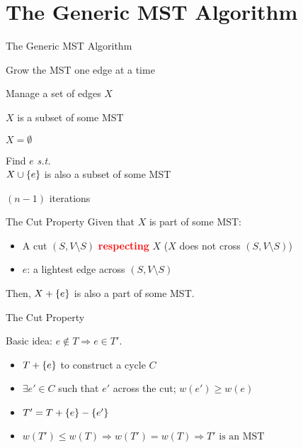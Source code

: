 \section{The Generic MST Algorithm}	\label{section:mst-generic-alg}

\begin{frame}{The Generic MST Algorithm}
  \begin{description}
	\setlength{\itemsep}{5pt}
	\item<1->[Overview:] Grow the MST one edge at a time
	\item<2->[State:] Manage a set of edges $X$
	\item<3->[\textcolor{red}{\bf Invariant:}] $X$ is a subset of some MST
	\item<4->[Init:] $X = \emptyset$
	\item<5->[Iteration:] Find  $e$ {\it s.t.} 
	  \\ $X \cup \{e\}$ is also a subset of some MST
	\item<7->[Termination:] $(n-1)$ iterations
  \end{description}

  \vspace{0.20cm}
\end{frame}
\begin{frame}{The Cut Property}
	Given that $X$ is part of some MST:
	\vspace{0.10cm}
    \begin{itemize}
	  \setlength{\itemsep}{3pt}
      \item<2-> A cut $(S, V \setminus S)$ \textcolor{red}{\bf respecting} $X$ ($X$ does not cross $(S, V \setminus S)$)
	  \item<6-> $e$: a lightest edge across $(S, V \setminus S)$
	\end{itemize}
	\vspace{0.10cm}
	Then, $X + \{e\}$ is also a part of some MST.

\end{frame}
\begin{frame}{The Cut Property}

  Basic idea: $e \notin T \Rightarrow e \in T'$.
  \begin{itemize}
    \item $T + \{e\}$ to construct a cycle $C$
    \item $\exists e'\in C$ such that $e'$ across the cut; $w(e')
    \geq w(e)$
    \item $T' = T + \{e\} - \{e'\}$
    \item $w(T') \le w(T) \Rightarrow w(T') = w(T) \Rightarrow T' \textrm{ is
    an MST}$
  \end{itemize}
\end{frame}
